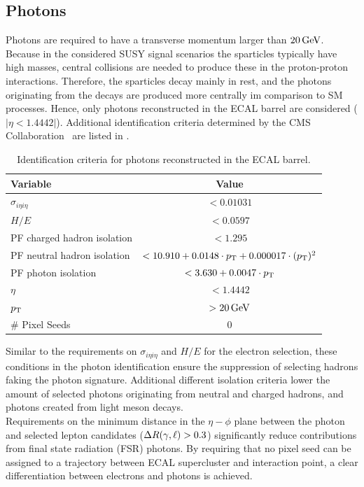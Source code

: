 \subsection{Photons}
Photons are required to have a transverse momentum larger than $20\,\text{Ge\hspace{-.08em}V}$.  Because in the considered SUSY signal scenarios the sparticles typically have high masses, central collisions are needed to produce these in the proton-proton interactions.  Therefore, the sparticles decay mainly in rest, and the photons originating from the decays are produced more centrally im comparison to SM processes. Hence, only photons reconstructed in the ECAL barrel are considered ($|\eta<1.4442|$). Additional identification criteria determined by the CMS Collaboration~\cite{photonID} are listed in .
\begin{table}[h!]
 \centering
 \caption{Identification criteria for photons reconstructed in the ECAL barrel.}
 \label{tab:photonID}
 \begin{tabular}{lc}
  Variable                    & Value                                                \\\hline
  $\sigma_{i\eta i\eta}$      & $<0.01031$                                           \\
  $H/E$                       & $<0.0597$                                            \\
  PF charged hadron isolation & $<1.295$                                             \\
  PF neutral hadron isolation & $<10.910 + 0.0148 \cdot p_{\mathrm{T}} + 0.000017\cdot (p_{\mathrm{T}})^2$ \\
  PF photon isolation         & $<3.630+0.0047\cdot p_{\mathrm{T}}$                             \\\hline
  $\eta$                      & $<1.4442$                                            \\
  $p_{\mathrm{T}}$                       & $>20\,\text{Ge\hspace{-.08em}V}$                                            \\
  \# Pixel Seeds              & 0                                                    \\\hline
 \end{tabular}
\end{table}
Similar to the requirements on $\sigma_{i\eta i\eta}$ and $H/E$ for the electron selection, these conditions in the photon identification ensure the suppression of selecting hadrons faking the photon signature. Additional different isolation criteria lower the amount of selected photons originating from neutral and charged hadrons, and photons created from light meson decays.\\
Requirements on the minimum distance in the $\eta-\phi$ plane between the photon and selected lepton candidates ($\Delta R(\gamma,\ell)>0.3$) significantly reduce contributions from final state radiation (FSR) photons. By requiring that no pixel seed can be assigned to a trajectory between ECAL supercluster and interaction point, a clear differentiation between electrons and photons is achieved.

